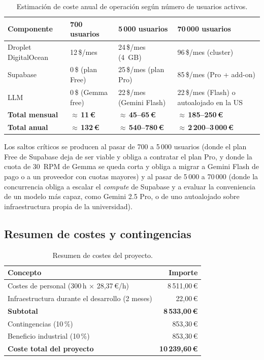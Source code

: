 \begin{table}[hbtp]
\centering
\footnotesize
\setlength{\tabcolsep}{4pt}
\begin{tabular}{|p{2.8cm}|p{2.8cm}|p{3.2cm}|p{3.8cm}|}
\hline
\textbf{Componente} & \textbf{700 usuarios} & \textbf{5\,000 usuarios} & \textbf{70\,000 usuarios} \\ \hline
Droplet DigitalOcean & 12\,\$/mes & 24\,\$/mes (4~GB) & 96\,\$/mes (cluster) \\ \hline
Supabase & 0\,\$ (plan Free) & 25\,\$/mes (plan Pro) & 85\,\$/mes (Pro + add-on) \\ \hline
LLM & 0\,\$ (Gemma free) & 22\,\$/mes (Gemini Flash) & 22\,\$/mes (Flash) o autoalojado en la US \\ \hline
\textbf{Total mensual} & \textbf{$\approx$\,11\,€} & \textbf{$\approx$\,45--65\,€} & \textbf{$\approx$\,185--250\,€} \\ \hline
\textbf{Total anual} & \textbf{$\approx$\,132\,€} & \textbf{$\approx$\,540--780\,€} & \textbf{$\approx$\,2\,200--3\,000\,€} \\ \hline
\end{tabular}
\caption{Estimación de coste anual de operación según número de usuarios activos.}
\label{tab:costes-escalado}
\end{table}

Los saltos críticos se producen al pasar de 700 a 5\,000 usuarios (donde el plan Free de Supabase deja de ser viable y obliga a contratar el plan Pro, y donde la cuota de 30~RPM de Gemma se queda corta y obliga a migrar a Gemini Flash de pago o a un proveedor con cuotas mayores) y al pasar de 5\,000 a 70\,000 (donde la concurrencia obliga a escalar el \textit{compute} de Supabase y a evaluar la conveniencia de un modelo más capaz, como Gemini 2.5 Pro, o de uno autoalojado sobre infraestructura propia de la universidad).

\subsection{Resumen de costes y contingencias}

\begin{table}[hbtp]
\centering
\small
\begin{tabular}{|l|r|}
\hline
\textbf{Concepto}                              & \textbf{Importe} \\ \hline
Costes de personal (300\,h $\times$ 28,37\,€/h)& 8\,511,00\,€ \\ \hline
Infraestructura durante el desarrollo (2 meses)&    22,00\,€ \\ \hline
\textbf{Subtotal}                              & \textbf{8\,533,00\,€} \\ \hline
Contingencias (10\,\%)                         &   853,30\,€ \\ \hline
Beneficio industrial (10\,\%)                  &   853,30\,€ \\ \hline
\textbf{Coste total del proyecto}              & \textbf{10\,239,60\,€} \\ \hline
\end{tabular}
\caption{Resumen de costes del proyecto.}
\label{tab:costes-resumen}
\end{table}

